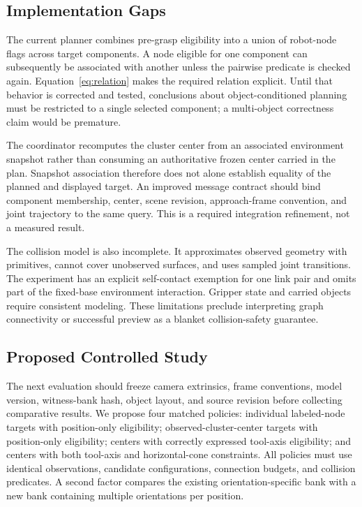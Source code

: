 \documentclass[letterpaper,10pt,conference]{ieeeconf}
\begin{document}
\subsection{Implementation Gaps}
The current planner combines pre-grasp eligibility into a union of robot-node flags across target components. A node eligible for one component can subsequently be associated with another unless the pairwise predicate is checked again. Equation~\eqref{eq:relation} makes the required relation explicit. Until that behavior is corrected and tested, conclusions about object-conditioned planning must be restricted to a single selected component; a multi-object correctness claim would be premature.

The coordinator recomputes the cluster center from an associated environment snapshot rather than consuming an authoritative frozen center carried in the plan. Snapshot association therefore does not alone establish equality of the planned and displayed target. An improved message contract should bind component membership, center, scene revision, approach-frame convention, and joint trajectory to the same query. This is a required integration refinement, not a measured result.

The collision model is also incomplete. It approximates observed geometry with primitives, cannot cover unobserved surfaces, and uses sampled joint transitions. The experiment has an explicit self-contact exemption for one link pair and omits part of the fixed-base environment interaction. Gripper state and carried objects require consistent modeling. These limitations preclude interpreting graph connectivity or successful preview as a blanket collision-safety guarantee.

\subsection{Proposed Controlled Study}
The next evaluation should freeze camera extrinsics, frame conventions, model version, witness-bank hash, object layout, and source revision before collecting comparative results. We propose four matched policies: individual labeled-node targets with position-only eligibility; observed-cluster-center targets with position-only eligibility; centers with correctly expressed tool-axis eligibility; and centers with both tool-axis and horizontal-cone constraints. All policies must use identical observations, candidate configurations, connection budgets, and collision predicates. A second factor compares the existing orientation-specific bank with a new bank containing multiple orientations per position.
\end{document}
